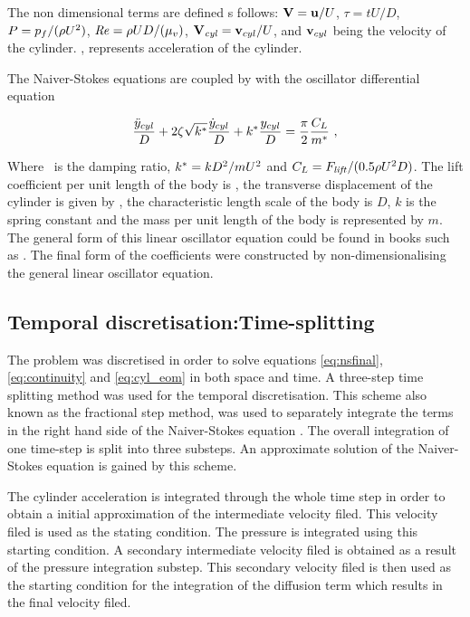    The non dimensional terms are defined s follows: $\mathbf{V} = \mathbf{u}/U$, $\tau = tU/D$, $P = p_{f}/(\rho
  U^{2})$, $\mathit{Re} = \rho UD/(\mu_{v})$, $\mathbf{V}_{\mathit{cyl}} = \mathbf{v}_{cyl}/U$, and 
  $\mathbf{v}_{cyl}$ being the velocity of the cylinder. \accframe, represents acceleration of the cylinder.  
  
  The Naiver-Stokes equations are coupled by with the oscillator differential equation 
  
  \begin{equation} \centering
  \label{eq:cyl_eom}
  \frac{\ddot{y}_{cyl}}{D} + 2\damping\sqrt{\kstar}\frac{\dot{y}_{cyl}}{D} + \kstar\frac{\ycyl}{D} = \frac{\pi}{2}\frac{\clift}{\mstar} ~,
  \end{equation}

  
    Where \damping \ is the damping ratio,  $k^{*}=kD^{2}/mU^{2}$ and
    $C_{L} = F_{\mathit{lift}}/(0.5\rho U^{2}D)$. The lift
    coefficient per unit length of the body is \clift, the transverse displacement of the cylinder is given by \ycyl,  the characteristic length scale of the body is $D$, $k$ is the spring constant and the mass per unit length of the body is represented by $m$. The general form of this linear oscillator equation could be found in books such as  \citet{Naudasher94}. The final form of the coefficients were constructed by non-dimensionalising the general linear oscillator equation. 
    
    
 
 \subsection{Temporal discretisation:Time-splitting}
 
 The problem was discretised in order to solve equations \ref{eq:nsfinal}, \ref{eq:continuity} and \ref{eq:cyl_eom} in both space and time. A three-step time splitting method was used for the temporal discretisation. This scheme also known as the fractional step method, was used to separately integrate the terms in the right hand side of the Naiver-Stokes equation \citep{karniadakis2005}. The overall integration of one time-step is split into three substeps. An approximate solution of the Naiver-Stokes equation is gained by this scheme. 
 
 The cylinder acceleration is integrated through the whole time step in order to obtain a initial approximation of the intermediate velocity filed. This velocity filed is used as the stating condition. The pressure is integrated using this starting condition.  A secondary intermediate velocity filed is obtained as a result of the pressure integration substep. This secondary velocity filed is then used as the starting condition for the integration of the diffusion term which results in the final velocity filed. 
 
